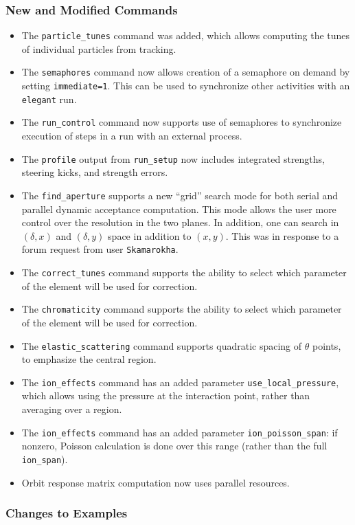 \documentclass[11pt]{article}
\begin{document}
\subsubsection{New and Modified Commands}
\begin{itemize}
\item The \verb|particle_tunes| command was added, which allows computing the tunes of individual particles
  from tracking.
\item The \verb|semaphores| command now allows creation of a semaphore on demand by setting \verb|immediate=1|.
  This can be used to synchronize other activities with an \verb|elegant| run.
\item The \verb|run_control| command now supports use of semaphores to synchronize execution of steps in a run
  with an external process.
\item The \verb|profile| output from \verb|run_setup| now includes integrated strengths, steering kicks,
  and strength errors.
\item The \verb|find_aperture| supports a new ``grid'' search mode for both serial and parallel dynamic acceptance computation.
  This mode allows the user more control over the resolution in the two planes. In addition, one can search in $(\delta, x)$ and
  $(\delta, y)$ space in addition to $(x,y)$. This was in response to a forum request from user \verb|Skamarokha|.
\item The \verb|correct_tunes| command supports the ability to select which parameter of the element will be used for
  correction.
\item The \verb|chromaticity| command supports the ability to select which parameter of the element will be used for
  correction.
\item The \verb|elastic_scattering| command supports quadratic spacing of $\theta$ points, to emphasize the central
  region.
\item The \verb|ion_effects| command has an added parameter \verb|use_local_pressure|, which allows using the pressure at the interaction point, 
  rather than averaging over a region.  
\item The \verb|ion_effects| command has an added parameter \verb|ion_poisson_span|: if nonzero, Poisson calculation is
  done over this range (rather than the full \verb|ion_span|).
\item Orbit response matrix computation now uses parallel resources.
\end{itemize}

\subsubsection{Changes to Examples}
\end{document}
